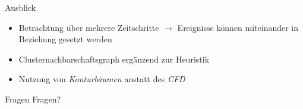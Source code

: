 \documentclass[10pt]{beamer}
\newcommand{\wichtig}[1]{\textit{#1}}
\begin{document}
%
%
\begin{frame}{Ausblick}
	\begin{itemize}
		\item Betrachtung über mehrere Zeitschritte $\rightarrow$ Ereignisse können miteinander in Beziehung gesetzt werden
		\item Clusternachbarschaftsgraph ergänzend zur Heuristik
		\item Nutzung von \wichtig{Konturbäumen} anstatt des \wichtig{CFD}
	\end{itemize}
\end{frame}

\begin{frame}{Fragen}
	Fragen?
\end{frame}
\end{document}
